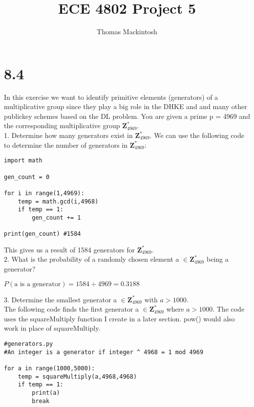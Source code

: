 \documentclass{article}
\begin{document}
\title{ECE 4802 Project 5}
\author{Thomas Mackintosh}
\maketitle

\section{8.4}

In this exercise we want to identify primitive elements (generators) of a multiplicative group since they play a big role in the DHKE and and many other publickey schemes based on the DL problem. You are given a prime p = 4969 and the corresponding multiplicative group $\textbf{Z}_{4969}^*$.\\

1. Determine how many generators exist in $\textbf{Z}_{4969}^*$.
We can use the following code to determine the number of generators in $\textbf{Z}_{4969}^*$:
\begin{framed}

\begin{verbatim}
import math

gen_count = 0

for i in range(1,4969):
    temp = math.gcd(i,4968)
    if temp == 1:
        gen_count += 1

print(gen_count) #1584
\end{verbatim}

\end{framed}

This gives us a result of 1584 generators for $\textbf{Z}_{4969}^*$.\\

2. What is the probability of a randomly chosen element a $ \in \textbf{Z}_{4969}^*$ being a generator?\\
\begin{center}
$P(\textrm{a is a generator}) = 1584\div4969 = 0.3188$
\end{center}

3. Determine the smallest generator a $ \in \textbf{Z}_{4969}^*$ with $a > 1000$.\\

The following code finds the first generator a $ \in \textbf{Z}_{4969}^*$ where $a > 1000$. The code uses the squareMultiply function I create in a later section. pow() would also work in place of squareMultiply.

\begin{framed}
\begin{verbatim}
#generators.py
#An integer is a generator if integer ^ 4968 = 1 mod 4969

for a in range(1000,5000):
    temp = squareMultiply(a,4968,4968)
    if temp == 1:
        print(a)
        break
\end{verbatim}
\end{framed}
\end{document}

